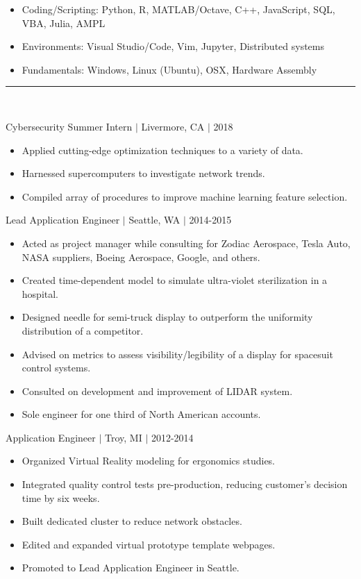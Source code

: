 \documentclass[11pt]{article}
\begin{document}
\begin{itemize}
\item Coding/Scripting: Python, R, MATLAB/Octave, C++, JavaScript, SQL, VBA, Julia, AMPL
\item Environments: Visual Studio/Code, Vim, Jupyter, Distributed systems
\item Fundamentals: Windows, Linux (Ubuntu), OSX, Hardware Assembly
\end{itemize}

\vspace{8pt}\hrule\vspace{10pt}
\\
\vspace{-8pt}

\hfill{Cybersecurity Summer Intern $|$ Livermore, CA $|$ 2018}

\begin{itemize}
\item Applied cutting-edge optimization techniques to a variety of data.
\item Harnessed supercomputers to investigate network trends.
\item Compiled array of procedures to improve machine learning feature selection.
\end{itemize}

\hfill { Lead Application Engineer $|$ Seattle, WA $|$ 2014-2015}

\begin{itemize}
\item Acted as project manager while consulting for Zodiac Aerospace, Tesla Auto, NASA suppliers, Boeing Aerospace, Google, and others.
\item Created time-dependent model to simulate ultra-violet sterilization in a hospital.
\item Designed needle for semi-truck display to outperform the uniformity distribution of a competitor.
\item Advised on metrics to assess visibility/legibility of a display for spacesuit control systems.
\item Consulted on development and improvement of LIDAR system.
\item Sole engineer for one third of North American accounts.
\end{itemize}

\hfill { Application Engineer $|$ Troy, MI $|$ 2012-2014}

\begin{itemize}
\item Organized Virtual Reality modeling for ergonomics studies.
\item Integrated quality control tests pre-production, reducing customer's decision time by six weeks.
\item Built dedicated cluster to reduce network obstacles.
\item Edited and expanded virtual prototype template webpages.
\item Promoted to Lead Application Engineer in Seattle.
\end{itemize}
\end{document}
